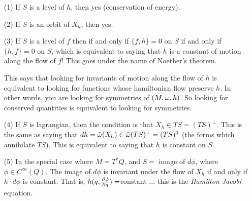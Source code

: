 \begin{itemize}
 \item[(1)] If $S$ is a level of $h$, then yes (conservation of energy).
 \item[(2)] If $S$ is an orbit of $X_h$, then yes.
 \item[(3)] If $S$ is a level of $f$ then if and only if $\{f,h\}=0$ on $S$ if
 and only if $\{h,f\}=0$ on $S$, which is equivalent to saying
 that $h$ is a constant of motion along the flow of $f$!  This
 goes under the name of Noether's theorem.

 This says that looking for invariants of motion along the flow of
 $h$ is equivalent to looking for functions whose hamiltonian flow
 preserve $h$.  In other words, you are looking for symmetries of
 $(M,\omega,h)$.  So looking for conserved quantities is equivalent to
 looking for symmetries.
 \item[(4)] If $S$ is lagrangian, then the condition is that
 $X_h\in TS = (TS)^\perp$.  This is the same as saying that
 $dh = \tilde{\omega} (X_h)\in \tilde{\omega} (TS)^\perp = (TS)^0$ (the forms which
 annihilate $TS$).  This is equivalent to saying that $h$ is
 constant on $S$.

 \item[(5)] In the special case where $M=T^*Q$, and $S=$ image of
 $d\phi$, where $\phi\in C^\infty(Q)$.  The image of $d\phi$ is
 invariant under the flow of $X_h$ if and only if $h\cdot d\phi$
 is constant.  That is, $h(q,\frac{\partial \phi}{\partial q})=$constant ... this is
 the \emph{Hamilton-Jacobi} equation.
 \end{itemize}
